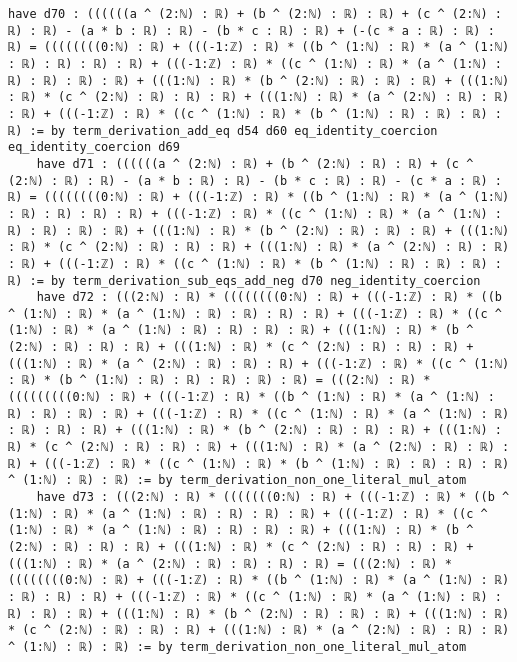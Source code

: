 \documentclass{article}
\begin{document}
\begin{tcolorbox}[colback=white!10, width=\linewidth]
\begin{lstlisting}[language=Lean4]
    have d70 : ((((((a ^ (2:ℕ) : ℝ) + (b ^ (2:ℕ) : ℝ) : ℝ) + (c ^ (2:ℕ) : ℝ) : ℝ) - (a * b : ℝ) : ℝ) - (b * c : ℝ) : ℝ) + (-(c * a : ℝ) : ℝ) : ℝ) = ((((((((0:ℕ) : ℝ) + (((-1:ℤ) : ℝ) * ((b ^ (1:ℕ) : ℝ) * (a ^ (1:ℕ) : ℝ) : ℝ) : ℝ) : ℝ) + (((-1:ℤ) : ℝ) * ((c ^ (1:ℕ) : ℝ) * (a ^ (1:ℕ) : ℝ) : ℝ) : ℝ) : ℝ) + (((1:ℕ) : ℝ) * (b ^ (2:ℕ) : ℝ) : ℝ) : ℝ) + (((1:ℕ) : ℝ) * (c ^ (2:ℕ) : ℝ) : ℝ) : ℝ) + (((1:ℕ) : ℝ) * (a ^ (2:ℕ) : ℝ) : ℝ) : ℝ) + (((-1:ℤ) : ℝ) * ((c ^ (1:ℕ) : ℝ) * (b ^ (1:ℕ) : ℝ) : ℝ) : ℝ) : ℝ) := by term_derivation_add_eq d54 d60 eq_identity_coercion eq_identity_coercion d69
    have d71 : ((((((a ^ (2:ℕ) : ℝ) + (b ^ (2:ℕ) : ℝ) : ℝ) + (c ^ (2:ℕ) : ℝ) : ℝ) - (a * b : ℝ) : ℝ) - (b * c : ℝ) : ℝ) - (c * a : ℝ) : ℝ) = ((((((((0:ℕ) : ℝ) + (((-1:ℤ) : ℝ) * ((b ^ (1:ℕ) : ℝ) * (a ^ (1:ℕ) : ℝ) : ℝ) : ℝ) : ℝ) + (((-1:ℤ) : ℝ) * ((c ^ (1:ℕ) : ℝ) * (a ^ (1:ℕ) : ℝ) : ℝ) : ℝ) : ℝ) + (((1:ℕ) : ℝ) * (b ^ (2:ℕ) : ℝ) : ℝ) : ℝ) + (((1:ℕ) : ℝ) * (c ^ (2:ℕ) : ℝ) : ℝ) : ℝ) + (((1:ℕ) : ℝ) * (a ^ (2:ℕ) : ℝ) : ℝ) : ℝ) + (((-1:ℤ) : ℝ) * ((c ^ (1:ℕ) : ℝ) * (b ^ (1:ℕ) : ℝ) : ℝ) : ℝ) : ℝ) := by term_derivation_sub_eqs_add_neg d70 neg_identity_coercion
    have d72 : (((2:ℕ) : ℝ) * ((((((((0:ℕ) : ℝ) + (((-1:ℤ) : ℝ) * ((b ^ (1:ℕ) : ℝ) * (a ^ (1:ℕ) : ℝ) : ℝ) : ℝ) : ℝ) + (((-1:ℤ) : ℝ) * ((c ^ (1:ℕ) : ℝ) * (a ^ (1:ℕ) : ℝ) : ℝ) : ℝ) : ℝ) + (((1:ℕ) : ℝ) * (b ^ (2:ℕ) : ℝ) : ℝ) : ℝ) + (((1:ℕ) : ℝ) * (c ^ (2:ℕ) : ℝ) : ℝ) : ℝ) + (((1:ℕ) : ℝ) * (a ^ (2:ℕ) : ℝ) : ℝ) : ℝ) + (((-1:ℤ) : ℝ) * ((c ^ (1:ℕ) : ℝ) * (b ^ (1:ℕ) : ℝ) : ℝ) : ℝ) : ℝ) : ℝ) = (((2:ℕ) : ℝ) * (((((((((0:ℕ) : ℝ) + (((-1:ℤ) : ℝ) * ((b ^ (1:ℕ) : ℝ) * (a ^ (1:ℕ) : ℝ) : ℝ) : ℝ) : ℝ) + (((-1:ℤ) : ℝ) * ((c ^ (1:ℕ) : ℝ) * (a ^ (1:ℕ) : ℝ) : ℝ) : ℝ) : ℝ) + (((1:ℕ) : ℝ) * (b ^ (2:ℕ) : ℝ) : ℝ) : ℝ) + (((1:ℕ) : ℝ) * (c ^ (2:ℕ) : ℝ) : ℝ) : ℝ) + (((1:ℕ) : ℝ) * (a ^ (2:ℕ) : ℝ) : ℝ) : ℝ) + (((-1:ℤ) : ℝ) * ((c ^ (1:ℕ) : ℝ) * (b ^ (1:ℕ) : ℝ) : ℝ) : ℝ) : ℝ) ^ (1:ℕ) : ℝ) : ℝ) := by term_derivation_non_one_literal_mul_atom
    have d73 : (((2:ℕ) : ℝ) * (((((((0:ℕ) : ℝ) + (((-1:ℤ) : ℝ) * ((b ^ (1:ℕ) : ℝ) * (a ^ (1:ℕ) : ℝ) : ℝ) : ℝ) : ℝ) + (((-1:ℤ) : ℝ) * ((c ^ (1:ℕ) : ℝ) * (a ^ (1:ℕ) : ℝ) : ℝ) : ℝ) : ℝ) + (((1:ℕ) : ℝ) * (b ^ (2:ℕ) : ℝ) : ℝ) : ℝ) + (((1:ℕ) : ℝ) * (c ^ (2:ℕ) : ℝ) : ℝ) : ℝ) + (((1:ℕ) : ℝ) * (a ^ (2:ℕ) : ℝ) : ℝ) : ℝ) : ℝ) = (((2:ℕ) : ℝ) * ((((((((0:ℕ) : ℝ) + (((-1:ℤ) : ℝ) * ((b ^ (1:ℕ) : ℝ) * (a ^ (1:ℕ) : ℝ) : ℝ) : ℝ) : ℝ) + (((-1:ℤ) : ℝ) * ((c ^ (1:ℕ) : ℝ) * (a ^ (1:ℕ) : ℝ) : ℝ) : ℝ) : ℝ) + (((1:ℕ) : ℝ) * (b ^ (2:ℕ) : ℝ) : ℝ) : ℝ) + (((1:ℕ) : ℝ) * (c ^ (2:ℕ) : ℝ) : ℝ) : ℝ) + (((1:ℕ) : ℝ) * (a ^ (2:ℕ) : ℝ) : ℝ) : ℝ) ^ (1:ℕ) : ℝ) : ℝ) := by term_derivation_non_one_literal_mul_atom

\end{lstlisting}
\end{tcolorbox}
\end{document}
